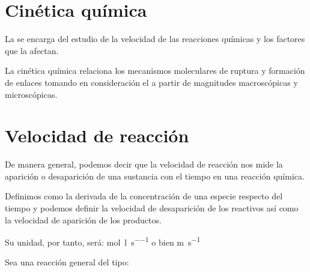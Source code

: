 \vspace*{18pt}
\section{Cinética química}\label{sec:cinetica-quimica}

\begin{center}
    \begin{definition}
        La  se encarga del estudio de la velocidad de las reacciones químicas y los factores que la afectan.
    \end{definition}
\end{center}

La cinética química relaciona los mecanismos moleculares de ruptura y formación de enlaces tomando en consideración el  a partir de magnitudes macroscópicas y microscópicas.


\section{Velocidad de reacción}\label{sec:velocidad-de-reaccion}

De manera general, podemos decir que la velocidad de reacción nos mide la aparición o desaparición de una sustancia con el tiempo en una reacción química.

\begin{center}
    \begin{definition}
        Definimos  como la derivada de la concentración de una especie respecto del tiempo y podemos definir la velocidad de desaparición de los reactivos así como la velocidad de aparición de los productos.

        Su unidad, por tanto, será: \unit{\mole\per\litre\per\s} o bien \unit{\m\per\s}
    \end{definition}
\end{center}

Sea una reacción general del tipo:
\begin{centeredequation}
     \label{eq:general}
\end{centeredequation}

